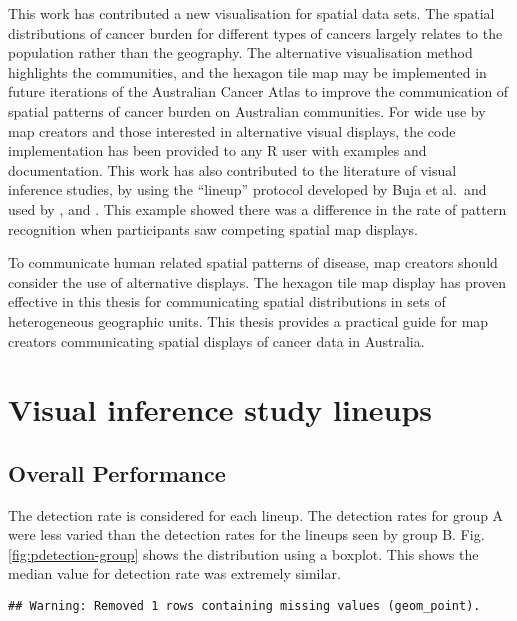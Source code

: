 \documentclass{monashthesis}
\begin{document}
This work has contributed a new visualisation for spatial data sets. The spatial distributions of cancer burden for different types of cancers largely relates to the population rather than the geography. The alternative visualisation method highlights the communities, and the hexagon tile map may be implemented in future iterations of the Australian Cancer Atlas to improve the communication of spatial patterns of cancer burden on Australian communities. For wide use by map creators and those interested in alternative visual displays, the code implementation has been provided to any R user with examples and documentation.
This work has also contributed to the literature of visual inference studies, by using the ``lineup'' protocol developed by Buja et al.~and used by \textcite{GIIV}, and \textcite{GTPCCD}. This example showed there was a difference in the rate of pattern recognition when participants saw competing spatial map displays.

To communicate human related spatial patterns of disease, map creators should consider the use of alternative displays. The hexagon tile map display has proven effective in this thesis for communicating spatial distributions in sets of heterogeneous geographic units. This thesis provides a practical guide for map creators communicating spatial displays of cancer data in Australia.

\appendix

\hypertarget{visual-inference-study-lineups}{%
\chapter{Visual inference study lineups}\label{visual-inference-study-lineups}}

\hypertarget{overall-performance}{%
\section{Overall Performance}\label{overall-performance}}

The detection rate is considered for each lineup. The detection rates for group A were less varied than the detection rates for the lineups seen by group B. Fig. \ref{fig:pdetection-group} shows the distribution using a boxplot. This shows the median value for detection rate was extremely similar.

\begin{verbatim}
## Warning: Removed 1 rows containing missing values (geom_point).
\end{verbatim}
\end{document}

